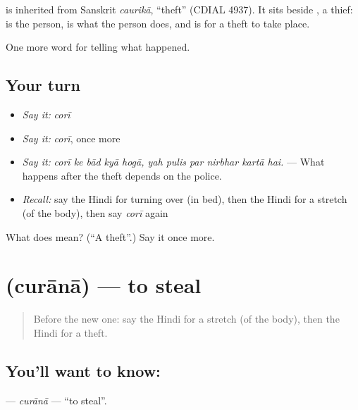 \begin{cousinweb}
is inherited from Sanskrit \emph{caurikā}, \textquotedblleft{}theft\textquotedblright{} (CDIAL 4937). It sits beside \textbf{}, a thief: \textbf{} is the person, \textbf{} is what the person does, and \textbf{ } is for a theft to take place.
\end{cousinweb}

\begin{grammarlens}[title={What you've built}]
One more word for telling what happened.
\end{grammarlens}

\subsection*{Your turn}
\begin{itemize}
\raggedright
  \item \emph{Say it:} \emph{corī}
  \item \emph{Say it:} \emph{corī}, once more
  \item \emph{Say it:} \emph{corī ke bād kyā hogā, yah pulis par nirbhar kartā hai.} — What happens after the theft depends on the police.
  \item \emph{Recall:} say the Hindi for turning over (in bed), then the Hindi for a stretch (of the body), then say \emph{corī} again
\end{itemize}

\begin{tcolorbox}[breakable,colback=teal!4,colframe=teal!35!black,title={Before you move on}]
What does  mean? (\textquotedblleft{}A theft\textquotedblright{}.) Say it once more.
\end{tcolorbox}
\section[\texorpdfstring{\hi{चुराना} (curānā)}{चुराना (curānā)}]{ (curānā) — to steal}

\label{lesson:HI-C288-curana}



\begin{quote}
Before the new one: say the Hindi for a stretch (of the body), then the Hindi for a theft.
\end{quote}

\subsection*{You'll want to know: }
\textbf{} — \emph{curānā} — \textquotedblleft{}to steal\textquotedblright{}.

